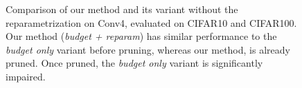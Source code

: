 \begin{figure}
  \centering
  \caption{Comparison of our method and its variant without the
    reparametrization on Conv4, evaluated on CIFAR10 and CIFAR100. Our method
    (\emph{budget + reparam}) has similar performance to the \emph{budget only}
    variant before pruning, whereas our method, is already pruned. Once pruned,
    the \emph{budget only} variant is significantly impaired.}
  \label{fig:chap1:budget_only_conv4}
\end{figure}


